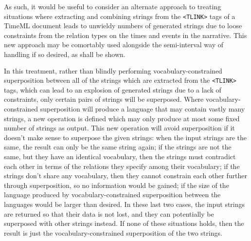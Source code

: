 \documentclass[a4paper,12pt,leqno]{article}
\begin{document}
As such, it would be useful to consider an alternate approach to treating situations where extracting and combining strings from the \verb|<TLINK>| tags of a TimeML document leads to unwieldy numbers of generated strings due to loose constraints from the relation types on the times and events in the narrative. This new approach may be comortably used alongside the semi-interval way of handling if so desired, as shall be shown.

In this treatment, rather than blindly performing vocabulary-constrained superposition between all of the strings which are extracted from the \verb|<TLINK>| tags, which can lead to an explosion of generated strings due to a lack of constraints, only certain pairs of strings will be superposed. Where vocabulary-constrained superposition will produce a language that may contain vastly many strings, a new operation is defined which may only produce at most some fixed number of strings as output. This new operation will avoid superposition if it doesn't make sense to superpose the given strings: when the input strings are the same, the result can only be the same string again; if the strings are not the same, but they have an identical vocabulary, then the strings must contradict each other in terms of the relations they specify among their vocabulary; if the strings don't share any vocabulary, then they cannot constrain each other further through superposition, so no information would be gained; if the size of the language produced by vocabulary-constrained superposition between the languages would be larger than desired. In these last two cases, the input strings are returned so that their data is not lost, and they can potentially be superposed with other strings instead. If none of these situations holds, then the result is just the vocabulary-constrained superposition of the two strings. 
\end{document}
